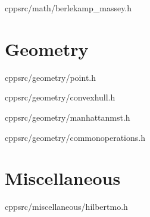 \documentclass[portrait, 8pt, a4paper, oneside, twocolumn]{extarticle}
\begin{document}
    {}
    {}
    {cpp}{src/math/berlekamp_massey.h}
    \noindent\hrulefill

\section{Geometry}

    {}
    {}
    {cpp}{src/geometry/point.h}
    \noindent\hrulefill

    {}
    {}
    {cpp}{src/geometry/convexhull.h}
    \noindent\hrulefill

    {}
    {}
    {cpp}{src/geometry/manhattanmst.h}
    \noindent\hrulefill

    {}
    {}
    {cpp}{src/geometry/commonoperations.h}
    \noindent\hrulefill

\section{Miscellaneous}

    {}
    {}
    {cpp}{src/miscellaneous/hilbertmo.h}
    \noindent\hrulefill
\end{document}
